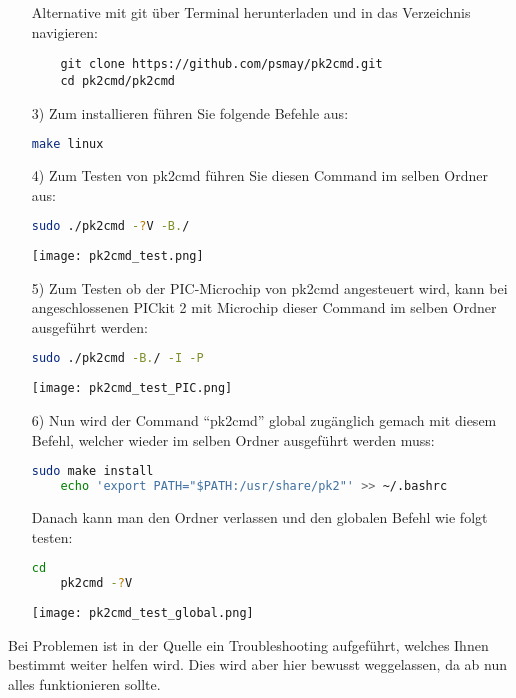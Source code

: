 \begin{itemize}
    Alternative mit git über Terminal herunterladen und in das Verzeichnis navigieren:
    \begin{lstlisting}
    git clone https://github.com/psmay/pk2cmd.git
    cd pk2cmd/pk2cmd
    \end{lstlisting}
    \item[3)] Zum installieren führen Sie folgende Befehle aus:
    \begin{lstlisting}[language=bash]
    make linux
    \end{lstlisting}
    \item[4)] Zum Testen von pk2cmd führen Sie diesen Command im selben Ordner aus:
    \begin{lstlisting}[language=bash]
    sudo ./pk2cmd -?V -B./
    \end{lstlisting}
    \begin{center}
        \texttt{[image: pk2cmd\_test.png]}
    \end{center}
    \newpage
    \item[5)] Zum Testen ob der PIC-Microchip von {\ttfamily pk2cmd} angesteuert wird, kann bei angeschlossenen PICkit 2 mit Microchip dieser Command im selben Ordner ausgeführt werden:
    \begin{lstlisting}[language=bash]
    sudo ./pk2cmd -B./ -I -P
    \end{lstlisting}
    \begin{center}
        \texttt{[image: pk2cmd\_test\_PIC.png]}
    \end{center}
    \item[6)] Nun wird der Command \enquote{pk2cmd} global zugänglich gemach mit diesem Befehl, welcher wieder im selben Ordner ausgeführt werden muss:
    \begin{lstlisting}[language=bash]
    sudo make install
    echo 'export PATH="$PATH:/usr/share/pk2"' >> ~/.bashrc
    \end{lstlisting}
    Danach kann man den Ordner verlassen und den globalen Befehl wie folgt testen:
    \begin{lstlisting}[language=bash]
    cd
    pk2cmd -?V
    \end{lstlisting}
    \begin{center}
       \texttt{[image: pk2cmd\_test\_global.png]}
    \end{center}
\end{itemize}
Bei Problemen ist in der Quelle ein Troubleshooting aufgeführt, welches Ihnen bestimmt weiter helfen wird. Dies wird aber hier bewusst weggelassen, da ab nun alles funktionieren sollte.
\newpage
